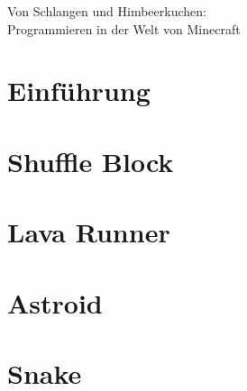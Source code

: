 \documentclass{article}
\begin{document}
	\begin{center}
		\huge Von Schlangen und Himbeerkuchen:\\Programmieren in der Welt von Minecraft
	\end{center}
	\section{Einführung}
		
	\section{Shuffle Block}
		\subsection{}
		
		\subsection{}
		
	\section{Lava Runner}
		
	\newpage
	\section{Astroid}
		
	\newpage
	\section{Snake}
		
\end{document}
